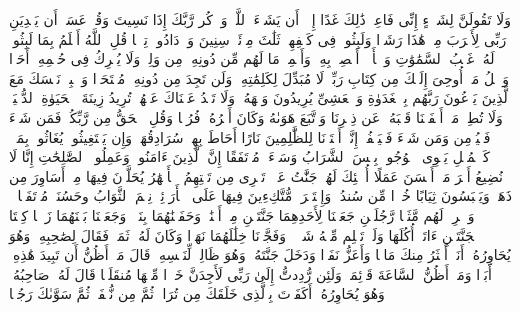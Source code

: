 \stopbuffer
\startbuffer[\q:18:23]
وَلَا تَقُولَنَّ لِشَا۟یۡءٍ إِنِّی فَاعِلࣱ ذَٰلِكَ غَدًا%
\stopbuffer
\startbuffer[\q:18:24]
إِلَّاۤ أَن یَشَاۤءَ ٱللَّهُۚ وَٱذۡكُر رَّبَّكَ إِذَا نَسِیتَ وَقُلۡ عَسَىٰۤ أَن یَهۡدِیَنِ رَبِّی لِأَقۡرَبَ مِنۡ هَٰذَا رَشَدࣰا%
\stopbuffer
\startbuffer[\q:18:25]
وَلَبِثُوا۟ فِی كَهۡفِهِمۡ ثَلَٰثَ مِا۟ئَةࣲ سِنِینَ وَٱزۡدَادُوا۟ تِسۡعࣰا%
\stopbuffer
\startbuffer[\q:18:26]
قُلِ ٱللَّهُ أَعۡلَمُ بِمَا لَبِثُوا۟ۖ لَهُۥ غَیۡبُ ٱلسَّمَٰوَٰتِ وَٱلۡأَرۡضِۖ أَبۡصِرۡ بِهِۦ وَأَسۡمِعۡۚ مَا لَهُم مِّن دُونِهِۦ مِن وَلِیࣲّ وَلَا یُشۡرِكُ فِی حُكۡمِهِۦۤ أَحَدࣰا%
\stopbuffer
\startbuffer[\q:18:27]
وَٱتۡلُ مَاۤ أُوحِیَ إِلَیۡكَ مِن كِتَابِ رَبِّكَۖ لَا مُبَدِّلَ لِكَلِمَٰتِهِۦ وَلَن تَجِدَ مِن دُونِهِۦ مُلۡتَحَدࣰا%
\stopbuffer
\startbuffer[\q:18:28]
وَٱصۡبِرۡ نَفۡسَكَ مَعَ ٱلَّذِینَ یَدۡعُونَ رَبَّهُم بِٱلۡغَدَوٰةِ وَٱلۡعَشِیِّ یُرِیدُونَ وَجۡهَهُۥۖ وَلَا تَعۡدُ عَیۡنَاكَ عَنۡهُمۡ تُرِیدُ زِینَةَ ٱلۡحَیَوٰةِ ٱلدُّنۡیَاۖ وَلَا تُطِعۡ مَنۡ أَغۡفَلۡنَا قَلۡبَهُۥ عَن ذِكۡرِنَا وَٱتَّبَعَ هَوَىٰهُ وَكَانَ أَمۡرُهُۥ فُرُطࣰا%
\stopbuffer
\startbuffer[\q:18:29]
وَقُلِ ٱلۡحَقُّ مِن رَّبِّكُمۡۖ فَمَن شَاۤءَ فَلۡیُؤۡمِن وَمَن شَاۤءَ فَلۡیَكۡفُرۡۚ إِنَّاۤ أَعۡتَدۡنَا لِلظَّٰلِمِینَ نَارًا أَحَاطَ بِهِمۡ سُرَادِقُهَاۚ وَإِن یَسۡتَغِیثُوا۟ یُغَاثُوا۟ بِمَاۤءࣲ كَٱلۡمُهۡلِ یَشۡوِی ٱلۡوُجُوهَۚ بِئۡسَ ٱلشَّرَابُ وَسَاۤءَتۡ مُرۡتَفَقًا%
\stopbuffer
\startbuffer[\q:18:30]
إِنَّ ٱلَّذِینَ ءَامَنُوا۟ وَعَمِلُوا۟ ٱلصَّٰلِحَٰتِ إِنَّا لَا نُضِیعُ أَجۡرَ مَنۡ أَحۡسَنَ عَمَلًا%
\stopbuffer
\startbuffer[\q:18:31]
أُو۟لَٰۤئِكَ لَهُمۡ جَنَّٰتُ عَدۡنࣲ تَجۡرِی مِن تَحۡتِهِمُ ٱلۡأَنۡهَٰرُ یُحَلَّوۡنَ فِیهَا مِنۡ أَسَاوِرَ مِن ذَهَبࣲ وَیَلۡبَسُونَ ثِیَابًا خُضۡرࣰا مِّن سُندُسࣲ وَإِسۡتَبۡرَقࣲ مُّتَّكِءِینَ فِیهَا عَلَى ٱلۡأَرَاۤئِكِۚ نِعۡمَ ٱلثَّوَابُ وحَسُنَتۡ مُرۡتَفَقࣰا%
\stopbuffer
\startbuffer[\q:18:32]
۞ وَٱضۡرِبۡ لَهُم مَّثَلࣰا رَّجُلَیۡنِ جَعَلۡنَا لِأَحَدِهِمَا جَنَّتَیۡنِ مِنۡ أَعۡنَٰبࣲ وَحَفَفۡنَٰهُمَا بِنَخۡلࣲ وَجَعَلۡنَا بَیۡنَهُمَا زَرۡعࣰا%
\stopbuffer
\startbuffer[\q:18:33]
كِلۡتَا ٱلۡجَنَّتَیۡنِ ءَاتَتۡ أُكُلَهَا وَلَمۡ تَظۡلِم مِّنۡهُ شَیۡءࣰاۚ وَفَجَّرۡنَا خِلَٰلَهُمَا نَهَرࣰا%
\stopbuffer
\startbuffer[\q:18:34]
وَكَانَ لَهُۥ ثَمَرࣱ فَقَالَ لِصَٰحِبِهِۦ وَهُوَ یُحَاوِرُهُۥۤ أَنَا۠ أَكۡثَرُ مِنكَ مَالࣰا وَأَعَزُّ نَفَرࣰا%
\stopbuffer
\startbuffer[\q:18:35]
وَدَخَلَ جَنَّتَهُۥ وَهُوَ ظَالِمࣱ لِّنَفۡسِهِۦ قَالَ مَاۤ أَظُنُّ أَن تَبِیدَ هَٰذِهِۦۤ أَبَدࣰا%
\stopbuffer
\startbuffer[\q:18:36]
وَمَاۤ أَظُنُّ ٱلسَّاعَةَ قَاۤئِمَةࣰ وَلَئِن رُّدِدتُّ إِلَىٰ رَبِّی لَأَجِدَنَّ خَیۡرࣰا مِّنۡهَا مُنقَلَبࣰا%
\stopbuffer
\startbuffer[\q:18:37]
قَالَ لَهُۥ صَاحِبُهُۥ وَهُوَ یُحَاوِرُهُۥۤ أَكَفَرۡتَ بِٱلَّذِی خَلَقَكَ مِن تُرَابࣲ ثُمَّ مِن نُّطۡفَةࣲ ثُمَّ سَوَّىٰكَ رَجُلࣰا%
